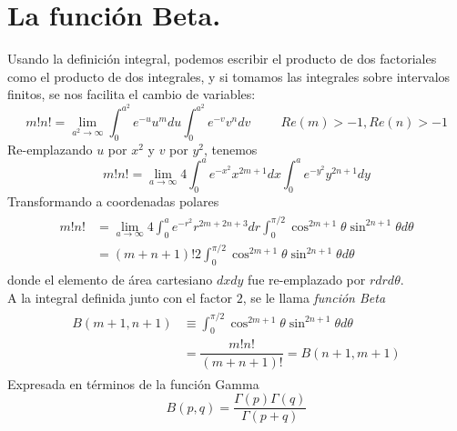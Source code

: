 \section{La función Beta.}
Usando la definición integral, podemos escribir el producto de dos factoriales como el producto de dos integrales, y si tomamos las integrales sobre intervalos finitos, se nos facilita el cambio de variables:
\begin{equation}
m! n! = \lim_{a^{2} \to \infty} \int_{0}^{a^{2}} e^{-u} u^{m} du \int_{0}^{a^{2}} e^{-v} v^{n} dv \hspace{1cm} Re(m) > -1, Re(n) > -1
\label{eq:ecuacion_10_57a}
\end{equation}
Re-emplazando $u$ por $x^{2}$ y $v$ por $y^{2}$, tenemos
\begin{equation}
m! n! =  \lim_{a \to \infty} 4 \int_{0}^{a} e^{-x^{2}} x ^{2m+1} dx \int_{0}^{a} e^{-y^{2}} y^{2n+1} dy
\label{eq:ecuacion_10_57b}
\end{equation}
Transformando a coordenadas polares
\begin{eqnarray}
\begin{aligned}
m! n! &= \lim_{a \to \infty} 4 \int_{0}^{a} e^{-r^{2}} r^{2m+2n+3} dr \int_{0}^{\pi/2} \cos^{2m+1} \theta \sin^{2n+1} \theta d\theta \\
&= (m+n+1)! 2 \int_{0}^{\pi/2} \cos^{2m+1} \theta \sin^{2n+1} \theta d \theta
\label{eq:ecuacion_10_58}
\end{aligned}
\end{eqnarray}
donde el elemento de área cartesiano $dxdy$ fue re-emplazado por $r dr d\theta$.
\\
A la integral definida junto con el factor $2$, se le llama \emph{función Beta}
\begin{eqnarray}
\begin{aligned}
B(m+1,n+1) &\equiv \int_{0}^{\pi/2} \cos^{2m+1} \theta \sin^{2n+1} \theta d \theta \\
&= \dfrac{m! n!}{(m+n+1)!} = B(n+1,m+1)
\label{eq:ecuacion_10_59a}
\end{aligned}
\end{eqnarray}
Expresada en términos de la función Gamma
\begin{equation}
B(p,q) = \dfrac{\Gamma(p) \Gamma(q)}{\Gamma(p+q)}
\label{eq:ecuacion_10_59b}
\end{equation}
